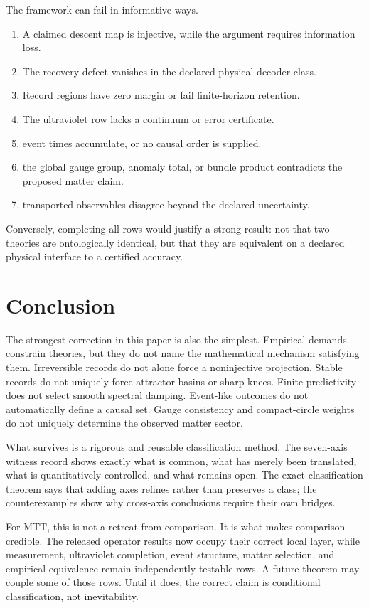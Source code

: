 \documentclass[11pt]{article}
\theoremstyle{definition}
\theoremstyle{remark}
\begin{document}
The framework can fail in informative ways.
\begin{enumerate}[label=(F\arabic*)]
  \item A claimed descent map is injective, while the argument requires
  information loss.
  \item The recovery defect vanishes in the declared physical decoder class.
  \item Record regions have zero margin or fail finite-horizon retention.
  \item The ultraviolet row lacks a continuum or error certificate.
  \item event times accumulate, or no causal order is supplied.
  \item the global gauge group, anomaly total, or bundle product contradicts
  the proposed matter claim.
  \item transported observables disagree beyond the declared uncertainty.
\end{enumerate}

Conversely, completing all rows would justify a strong result: not that two
theories are ontologically identical, but that they are equivalent on a
declared physical interface to a certified accuracy.

\section{Conclusion}
\label{sec:conclusion}

The strongest correction in this paper is also the simplest. Empirical demands
constrain theories, but they do not name the mathematical mechanism satisfying
them. Irreversible records do not alone force a noninjective projection. Stable
records do not uniquely force attractor basins or sharp knees. Finite
predictivity does not select smooth spectral damping. Event-like outcomes do
not automatically define a causal set. Gauge consistency and compact-circle
weights do not uniquely determine the observed matter sector.

What survives is a rigorous and reusable classification method. The seven-axis
witness record shows exactly what is common, what has merely been translated,
what is quantitatively controlled, and what remains open. The exact
classification theorem says that adding axes refines rather than preserves a
class; the counterexamples show why cross-axis conclusions require their own
bridges.

For MTT, this is not a retreat from comparison. It is what makes comparison
credible. The released operator results now occupy their correct local layer,
while measurement, ultraviolet completion, event structure, matter selection,
and empirical equivalence remain independently testable rows. A future theorem
may couple some of those rows. Until it does, the correct claim is conditional
classification, not inevitability.



\end{document}
